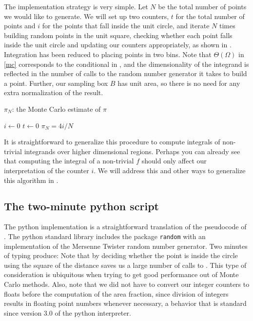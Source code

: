 The implementation strategy is very simple. Let $N$ be the total number of points we would like
to generate. We will set up two counters, $t$ for the total number of points and $i$ for the
points that fall inside the unit circle, and iterate $N$ times building random points in the
unit square, checking whether each point falls inside the unit circle and updating our counters
appropriately, as shown in .  Integration has been reduced to placing points in two
bins. Note that $\Theta(\Omega)$ in \eqref{mc} corresponds to the conditional in
, and the dimensionality of the integrand is reflected in the number of
calls to the random number generator it takes to build a point. Further, our sampling box $B$
has unit area, so there is no need for any extra normalization of the result.
% 
\begin{algorithm}
\caption{$\pi_{N}$: the Monte Carlo estimate of $\pi$ \label{alg:pi}}
%
\DontPrintSemicolon
\SetAlgoNoEnd
%
$i \leftarrow 0$ \;
$t \leftarrow 0$ \;
$\pi_{N} = 4 i/N \;$ %
\end{algorithm}
%

It is straightforward to generalize this procedure to compute integrals of non-trivial
integrands over higher dimensional regions. Perhaps you can already see that computing the
integral of a non-trivial $f$ should only affect our interpretation of the counter $i$. We will
address this and other ways to generalize this algorithm in .

\subsection{The two-minute python script}
\label{sec:simple:python}

The python implementation is a straightforward translation of the pseudocode of
. The python standard library\supercite{python-doc} includes the package {\tt random}
with an implementation of the Mersenne Twister\supercite{mersenne-twister} random number
generator. Two minutes of typing produce:
%
%
Note that by deciding whether the point is inside the circle using the square of the distance
saves us a large number of calls to . This type of consideration is ubiquitous
when trying to get good performance out of Monte Carlo methods.  Also, note that we did not
have to convert our integer counters to floats before the computation of the area fraction,
since division of integers results in floating point numbers whenever necessary, a behavior
that is standard since version 3.0 of the python interpreter.

